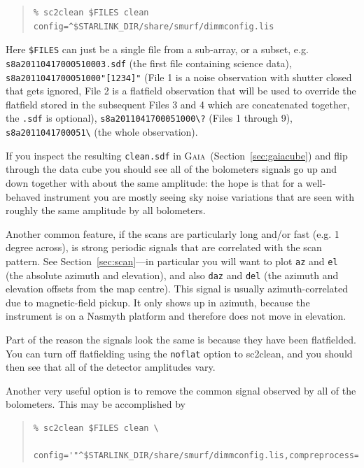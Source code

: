 \documentclass[twoside,11pt]{article}
\newcommand{\htmlref}[2]{#1}
\newcommand{\latexhtml}[2]{#1}
\newcommand{\xref}[3]{#1}
\renewcommand{\_}{\texttt{\symbol{95}}}
\newenvironment{myquote}{
   \color{MidnightBlue}\begin{quote}\begin{small}}{
   \end{small}\end{quote}
}
\newcommand{\gaia}{\xref{\textsc{Gaia}}{sun214}{}}
\newcommand{\task}[1]{\textsf{#1}}
\newcommand{\param}[1]{\texttt{#1}}
\newcommand{\file}[1]{\texttt{#1}}
\newcommand{\cref}[3]{\latexhtml{#1~\ref{#2}}{\htmlref{#3}{#2}}}
\renewenvironment{myquote}{
      \begin{quote}\begin{small}}{
      \end{small}\end{quote}
   }
\begin{document}
\begin{myquote}
\begin{verbatim}
% sc2clean $FILES clean config=^$STARLINK_DIR/share/smurf/dimmconfig.lis
\end{verbatim}
\end{myquote}

Here \file{\$FILES} can just be a single file from a sub-array, or a
subset, e.g. \file{s8a20110417\_00051\_0003.sdf} (the first file
containing science data), \file{s8a20110417\_00051\_000"[1234]"}
(File 1 is a noise observation with shutter closed that gets ignored,
File 2 is a flatfield observation that will be used to override the
flatfield stored in the subsequent Files 3 and 4 which are
concatenated together, the \file{.sdf} is optional),
\file{s8a20110417\_00051\_000\textbackslash?} (Files 1 through 9),
\file{s8a20110417\_00051\_\textbackslash*} (the whole observation).

If you inspect the resulting \file{clean.sdf} in \gaia\
(\cref{Section}{sec:gaiacube}{Displaying time-series data}) and flip
through the data cube you should
see all of the bolometers signals go up and down together with about
the same amplitude: the hope is that for a well-behaved instrument you
are mostly seeing sky noise variations that are seen with roughly the
same amplitude by all bolometers.

Another common feature, if the scans are particularly long and/or fast
(e.g. 1\,degree across), is strong periodic signals that are correlated
with the scan pattern. See \cref{Section}{sec:scan}{Displaying scan
patterns}---in particular
you will want to plot \texttt{az} and \texttt{el} (the absolute
azimuth and elevation), and also \texttt{daz} and \texttt{del} (the
azimuth and elevation offsets from the map centre). This signal is
usually azimuth-correlated due to magnetic-field pickup. It only shows
up in azimuth, because the instrument is on a Nasmyth platform and
therefore does not move in elevation.

Part of the reason the signals look the same is because they have been
flatfielded. You can turn off flatfielding using the \param{noflat}
option to \task{sc2clean}, and you should then see that all of the detector
amplitudes vary.

Another very useful option is to remove the common signal observed by
all of the bolometers. This may be accomplished by

\begin{myquote}
\begin{verbatim}
% sc2clean $FILES clean \
   config='"^$STARLINK_DIR/share/smurf/dimmconfig.lis,compreprocess=1"'
\end{verbatim}
\end{myquote}
\end{document}

